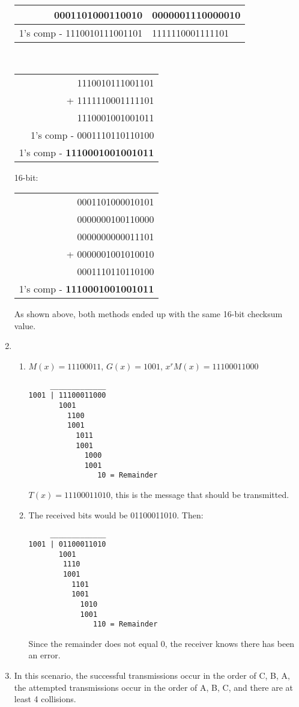 \documentclass[12pt]{article}
\begin{document}
\begin{enumerate}
\begin{center}
\begin{tabular}{r l}
0001101000110010 & 0000001110000010\\\hline
1's comp - 1110010111001101 & 1111110001111101
\end{tabular}\\
\begin{tabular}{r}
1110010111001101\\
+ 1111110001111101\\\hline
1110001001001011\\\hline
1's comp - 0001110110110100\\\hline
1's comp - \textbf{1110001001001011}
\end{tabular}
\end{center}
16-bit:
\begin{center}
\begin{tabular}{r}
0001101000010101\\
0000000100110000\\
0000000000011101\\
+ 0000001001010010\\\hline
0001110110110100\\\hline
1's comp - \textbf{1110001001001011}
\end{tabular}
\end{center}
As shown above, both methods ended up with the same 16-bit checksum value.\pagebreak
\item %
\begin{enumerate}
\item %
$M(x) = 11100011$, $G(x) = 1001$, $x^rM(x) = 11100011000$
\begin{verbatim}
     _____________
1001 | 11100011000
       1001
         1100
         1001
           1011
           1001
             1000
             1001
                10 = Remainder
\end{verbatim}
$T(x) = 11100011010$, this is the message that should be transmitted.
\item %
The received bits would be 01100011010. Then:
\begin{verbatim}
     _____________
1001 | 01100011010
       1001
        1110
        1001
          1101
          1001
            1010
            1001
               110 = Remainder
\end{verbatim}
Since the remainder does not equal 0, the receiver knows there has been an error.
\end{enumerate}
\item %
In this scenario, the successful transmissions occur in the order of C, B, A, the attempted transmissions occur in the order of A, B, C, and there are at least 4 collisions.

\end{enumerate}
\end{document}
